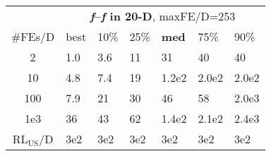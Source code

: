 \begin{tabular}{c|llllll}
 & \multicolumn{6}{|c}{\textbf{\textit{f}\raisebox{-0.35ex}{1}--\textit{f}\raisebox{-0.35ex}{24} in 20-D}, maxFE/D=253}\\
\#FEs/D & best & 10\% & 25\% & \textbf{med} & 75\% & 90\%\\
2 & \hspace*{1ex}1.0 & \hspace*{1ex}3.6 & 11 & 31 & 40 & 40\\
10 & \hspace*{1ex}4.8 & \hspace*{1ex}7.4 & 19 & 1.2e2 & 2.0e2 & 2.0e2\\
100 & \hspace*{1ex}7.9 & 21 & 30 & 46 & 58 & 2.0e3\\
1e3 & 36 & 43 & 62 & 1.4e2 & 2.1e2 & 2.4e3\\
$\text{RL}_{\text{US}}$/D & 3e2 & 3e2 & 3e2 & 3e2 & 3e2 & 3e2
\end{tabular}
